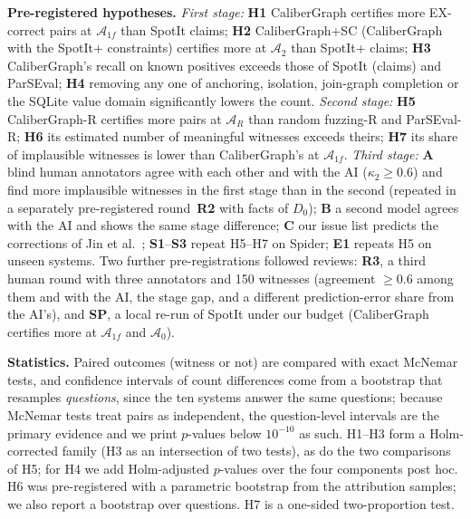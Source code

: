 \textbf{Pre-registered hypotheses.} \emph{First stage:} \textbf{H1} CaliberGraph certifies more EX-correct pairs at $\mathcal A_{1f}$ than SpotIt claims; \textbf{H2} CaliberGraph+SC (CaliberGraph with the SpotIt+ constraints) certifies more at $\mathcal A_2$ than SpotIt+ claims; \textbf{H3} CaliberGraph's recall on known positives exceeds those of SpotIt (claims) and ParSEval; \textbf{H4} removing any one of anchoring, isolation, join-graph completion or the SQLite value domain significantly lowers the count. \emph{Second stage:} \textbf{H5} CaliberGraph-R certifies more pairs at $\mathcal A_R$ than random fuzzing-R and ParSEval-R; \textbf{H6} its estimated number of meaningful witnesses exceeds theirs; \textbf{H7} its share of implausible witnesses is lower than CaliberGraph's at $\mathcal A_{1f}$. \emph{Third stage:} \textbf{A} blind human annotators agree with each other and with the AI ($\kappa_2\ge0.6$) and find more implausible witnesses in the first stage than in the second (repeated in a separately pre-registered round~\textbf{R2} with facts of $D_0$); \textbf{B} a second model agrees with the AI and shows the same stage difference; \textbf{C} our issue list predicts the corrections of Jin et al.~\cite{jin2026annotation}; \textbf{S1}--\textbf{S3} repeat H5--H7 on Spider; \textbf{E1} repeats H5 on unseen systems. Two further pre-registrations followed reviews: \textbf{R3}, a third human round with three annotators and 150 witnesses (agreement $\ge0.6$ among them and with the AI, the stage gap, and a different prediction-error share from the AI's), and \textbf{SP}, a local re-run of SpotIt under our budget (CaliberGraph certifies more at $\mathcal A_{1f}$ and $\mathcal A_0$).

\textbf{Statistics.} Paired outcomes (witness or not) are compared with exact McNemar tests, and confidence intervals of count differences come from a bootstrap that resamples \emph{questions}, since the ten systems answer the same questions; because McNemar tests treat pairs as independent, the question-level intervals are the primary evidence and we print $p$-values below $10^{-10}$ as such. H1--H3 form a Holm-corrected family (H3 as an intersection of two tests), as do the two comparisons of H5; for H4 we add Holm-adjusted $p$-values over the four components post hoc. H6 was pre-registered with a parametric bootstrap from the attribution samples; we also report a bootstrap over questions. H7 is a one-sided two-proportion test.
